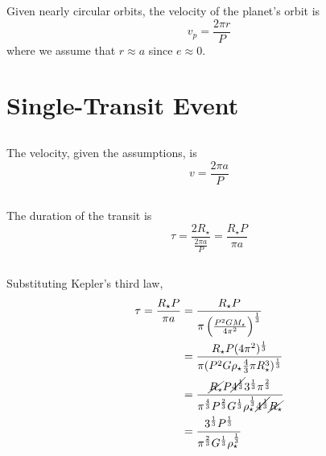 \documentclass{article}
\begin{document}
Given nearly circular orbits, the velocity of the planet's orbit is
\begin{equation}
    v_p = \frac{2 \pi r}{P}
\end{equation}
where we assume that \(r \approx a\) since \(e \approx 0\).

\section{Single-Transit Event}

\subsection{}

The velocity, given the assumptions, is
\begin{equation}
    v = \frac{2 \pi a}{P}
\end{equation}

\subsection{}

The duration of the transit is
\begin{equation}
    \tau = \frac{2 R_\star}{\frac{2 \pi a}{P}} = \frac{R_\star P}{\pi a}
\end{equation}

\subsection{}

Substituting Kepler's third law,
\begin{align}
    \tau = \frac{R_\star P}{\pi a} &= \frac{R_\star P}{\pi \left(\frac{P^2 G M_\star}{4 \pi^2}\right)^{\frac{1}{3}}} \\
    &= \frac{R_\star P (4 \pi^2)^{\frac{1}{3}}}{\pi (P^2 G \rho_\star \frac{4}{3} \pi R_\star^3)^{\frac{1}{3}}} \\
    &= \frac{\cancel{R_\star} P \cancel{4^{\frac{1}{3}}} 3^{\frac{1}{3}} \pi^{\frac{2}{3}}}{\pi^{\frac{4}{3}} P^{\frac{2}{3}} G^{\frac{1}{3}} \rho_\star^\frac{1}{3} \cancel{4^{\frac{1}{3}}} \cancel{R_\star}} \\
    &= \frac{3^{\frac{1}{3}} P^{\frac{1}{3}}}{\pi^{\frac{2}{3}} G^{\frac{1}{3}} \rho_\star^{\frac{1}{3}}}
\end{align}

\subsection{}
\end{document}
